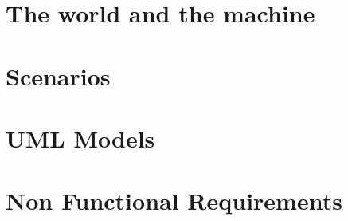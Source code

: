 \documentclass[]{report}
\begin{document}
\section{The world and the machine}


\section{Scenarios}


\section{UML Models}


\section{Non Functional Requirements}


%
%
%
%
%
%
%
%
%
\end{document}
